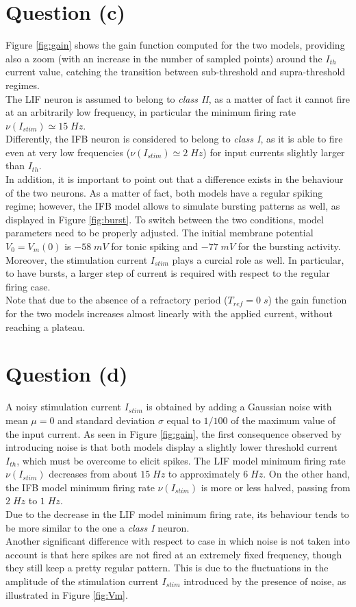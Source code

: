 \documentclass[10.5pt]{article}
\begin{document}
\section*{Question (c)}
Figure \ref{fig:gain} shows the gain function computed for the two models,
providing also a zoom (with an increase in the number of sampled points)
around the \(I_{th}\) current value, catching the transition between
sub-threshold and supra-threshold regimes.\\
The LIF neuron is assumed to belong to \textit{class II}, as a matter of fact 
it cannot fire at an arbitrarily low frequency, in particular the minimum
firing rate \(\nu(I_{stim})\simeq{15}\;Hz\).\\
Differently, the IFB neuron is considered to belong to \textit{class I}, as it is able to fire
even at very low frequencies (\(\nu(I_{stim})\simeq{2\;Hz}\)) for input currents slightly larger than \(I_{th}\).\\
In addition, it is important to point out that a difference exists in the behaviour of the
two neurons. As a matter of fact, both models have a regular spiking regime; however,
the IFB model allows to simulate bursting patterns as well, as displayed in Figure
\ref{fig:burst}. To switch between the two conditions, model parameters need to be
properly adjusted. The initial membrane potential \(V_{0}=V_{m}(0)\) is \(-58\;mV\) for tonic 
spiking and \(-77\;mV\) for the bursting activity. Moreover, the stimulation current
\(I_{stim}\) plays a curcial role as well. In particular, to have bursts, a larger
step of current is required with respect to the regular firing case.\\
Note that due to the absence of a refractory period (\(T_{ref}=0\;s\)) the gain function
for the two models increases almost linearly with the applied current, without reaching a plateau.

\section*{Question (d)}
A noisy stimulation current \(I_{stim}\) is obtained by adding a Gaussian noise with
mean \(\mu=0\) and standard deviation \(\sigma\) equal to \(1/100\) of the maximum value
of the input current. As seen in Figure \ref{fig:gain}, the first consequence observed by introducing noise
is that both
models display a slightly lower threshold current \(I_{th}\), which must be overcome
to elicit spikes. The LIF model minimum firing rate \(\nu(I_{stim})\) decreases from
about \(15\;Hz\) to approximately \(6\;Hz\). On the other hand, the IFB model minimum firing
rate \(\nu(I_{stim})\) is more or less halved, passing from \(2\;Hz\) to \(1\;Hz\).\\
Due to the decrease in the LIF model minimum firing rate, its behaviour
tends to be more similar to the one a \textit{class I} neuron.\\
Another significant difference with respect to case in which noise is not taken
into account is that here spikes are not fired at an extremely fixed frequency, though
they still keep a pretty regular pattern. This is due to the 
fluctuations in the amplitude of the stimulation current \(I_{stim}\) introduced by
the presence of noise, as illustrated in Figure \ref{fig:Vm}.
\end{document}
